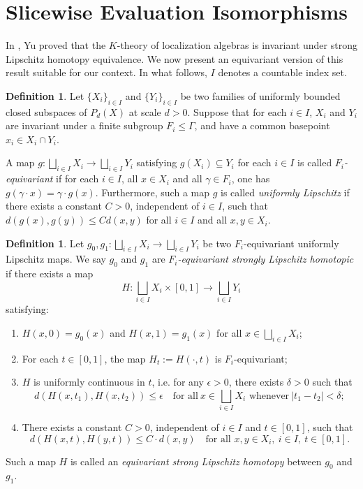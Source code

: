 \documentclass[pdflatex]{sn-jnl}
\theoremstyle{plain}
\theoremstyle{definition}
\newtheorem{definition}[theorem]{Definition}
\begin{document}
\section{Slicewise Evaluation Isomorphisms}

In \cite{Yu97}, Yu proved that the $K$-theory of localization algebras is invariant under strong Lipschitz homotopy equivalence. We now present an equivariant version of this result suitable for our context. In what follows, $I$ denotes a countable index set.
\begin{definition}\label{def:equivariant-lipschitz}
Let $\{X_i\}_{i\in I}$ and $\{Y_i\}_{i\in I}$ be two families of uniformly bounded closed subspaces of $P_{d}(X)$ at scale $d>0$. Suppose that for each $i\in I$, $X_i$ and $Y_i$ are invariant under a finite subgroup $F_i\leq\Gamma$, and have a common basepoint $x_i\in X_{i}\cap Y_i$.

A map $g:\bigsqcup_{i\in I}X_i\to\bigsqcup_{i\in I}Y_i$ satisfying $g(X_i)\subseteq Y_i$ for each $i\in I$ is called \emph{$F_i$-equivariant} if for each $i \in I$, all $x\in X_i$ and all $\gamma\in F_i$, one has $g(\gamma\cdot x)=\gamma\cdot g(x)$.
Furthermore, such a map $g$ is called \emph{uniformly Lipschitz} if 
there exists a constant $C>0$, independent of $i\in I$, such that $d(g(x),g(y))\leq Cd(x,y)$ for all $i \in I$ and all $x,y\in X_i$.
\end{definition}
\begin{definition}\label{def:equivariant-strong-lipschitz-homotopy}
Let $g_0,g_1:\bigsqcup_{i\in I}X_i\to\bigsqcup_{i\in I}Y_i$ be two $F_i$-equivariant uniformly Lipschitz maps. 
We say $g_0$ and $g_1$ are \emph{$F_i$-equivariant strongly Lipschitz homotopic} if there exists a map
\[H:\bigsqcup_{i\in I} X_i\times[0, 1]\to\bigsqcup_{i\in I}Y_i\]
satisfying:
\begin{enumerate}
\item [(1)] $H(x,0)=g_0(x)$ and $H(x,1)=g_1(x)$ for all $x\in\bigsqcup_{i\in I} X_i$;
\item [(2)] For each $t\in [0, 1]$, the map $H_t:= H(\cdot,t)$ is $F_i$-equivariant;
\item [(3)] $H$ is uniformly continuous in $t$, i.e. for any $\epsilon>0$, there exists $\delta>0$ such that 
\[d(H(x, t_1), H(x, t_2))\leq\epsilon\quad \text{for all}\ x\in\bigsqcup_{i\in I} X_i\text{ whenever}\ |t_1-t_2|<\delta;\]
\item [(4)] There exists a constant $C>0$, independent of $i\in I$ and $t\in [0, 1]$, such that
\[d(H(x,t),H(y,t))\leq C\cdot d(x,y)\quad\text{for all } x, y\in X_i,\ i\in I,\ t\in [0,1].\]
\end{enumerate}
Such a map $H$ is called an \emph{equivariant strong Lipschitz homotopy} between $g_0$ and $g_1$.
\end{definition}
\end{document}
